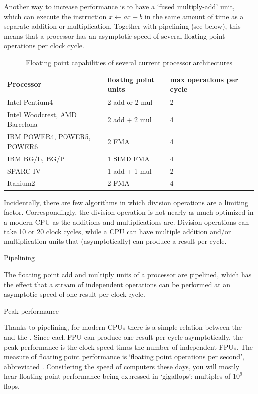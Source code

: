 Another way to increase performance is to have a `fused multiply-add'
unit, which can execute the instruction $x\leftarrow ax+b$ in the same
amount of time as a separate addition or multiplication. Together with
pipelining (see below), this means that a processor has an asymptotic
speed of several floating point operations per clock cycle.

\begin{table}[h]
  \centering
  \begin{tabular}{p{2.5in}lll}
Processor&floating point units&max operations per cycle\\ \hline
Intel Pentium4&2 add or 2 mul&2\\ %
Intel Woodcrest, AMD Barcelona&2 add + 2 mul&4 \\  %
IBM POWER4, POWER5, POWER6&    2 FMA & 4 \\
IBM BG/L, BG/P & 1 SIMD FMA & 4 \\
SPARC IV & 1 add + 1 mul& 2 \\
Itanium2 &  2 FMA & 4 
  \end{tabular}
  \caption{Floating point capabilities of several current processor architectures}
  \label{tab:chipfloats}
\end{table}

Incidentally, there are few algorithms in which division operations
are a limiting factor. Correspondingly, the division operation is not
nearly as much optimized in a modern CPU as the additions and
multiplications are. Division operations can take 10 or 20 clock
cycles, while a CPU can have multiple addition and/or multiplication
units that (asymptotically) can produce a result per cycle.

 {Pipelining}
\label{sec:pipeline}

The floating point add and multiply units of a processor are
pipelined, which has the effect that a stream of independent
operations can be performed at an asymptotic speed of one result per
clock cycle.




 {Peak performance}

Thanks to pipelining, for modern CPUs there is a simple relation
between the  and the .
Since each \ac{FPU} can produce one result per cycle
asymptotically, the peak performance is the clock speed times the
number of independent \acp{FPU}. The measure of floating
point performance is `floating point operations per second',
abbreviated . Considering the speed of computers
these days, you will mostly hear floating point performance being
expressed in `gigaflops': multiples of $10^9$ flops.

